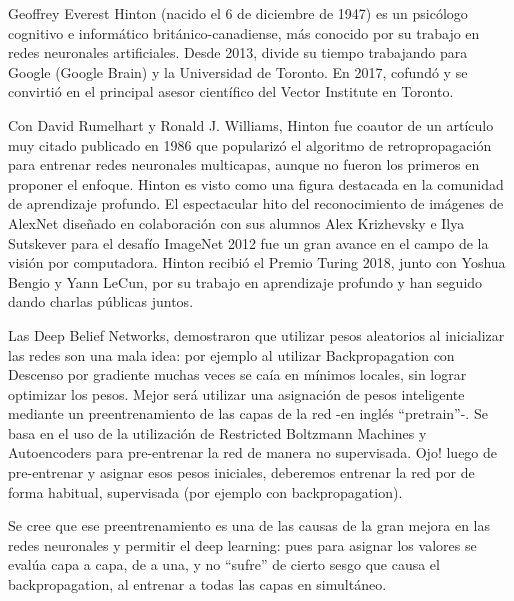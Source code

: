 \documentclass[a4paper]{article}
\begin{document}
Geoffrey Everest Hinton (nacido el 6 de diciembre de 1947) es un 
psicólogo cognitivo e informático británico-canadiense, más 
conocido por su trabajo en redes neuronales artificiales. Desde 
2013, divide su tiempo trabajando para Google (Google Brain) y la 
Universidad de Toronto. En 2017, cofundó y se convirtió en el 
principal asesor científico del Vector Institute en Toronto.

Con David Rumelhart y Ronald J. Williams, Hinton fue coautor de un 
artículo muy citado publicado en 1986 que popularizó el algoritmo 
de retropropagación para entrenar redes neuronales multicapas, 
aunque no fueron los primeros en proponer el enfoque. Hinton es 
visto como una figura destacada en la comunidad de aprendizaje 
profundo. El espectacular hito del reconocimiento de imágenes de 
AlexNet diseñado en colaboración con sus alumnos Alex Krizhevsky e 
Ilya Sutskever para el desafío ImageNet 2012 fue un gran avance en 
el campo de la visión por computadora.
Hinton recibió el Premio Turing 2018, junto con Yoshua Bengio y 
Yann LeCun, por su trabajo en aprendizaje profundo y han seguido 
dando charlas públicas juntos.

Las Deep Belief Networks, demostraron que utilizar pesos 
aleatorios al inicializar las redes son una mala idea: por ejemplo 
al utilizar Backpropagation con Descenso por gradiente muchas 
veces se caía en mínimos locales, sin lograr optimizar los pesos. 
Mejor será utilizar una asignación de pesos inteligente mediante 
un preentrenamiento de las capas de la red -en inglés “pretrain”-. 
Se basa en el uso de la utilización de Restricted Boltzmann 
Machines y Autoencoders para pre-entrenar la red de manera no 
supervisada. Ojo! luego de pre-entrenar y asignar esos pesos 
iniciales, deberemos entrenar la red por de forma habitual, 
supervisada (por ejemplo con backpropagation).

Se cree que ese preentrenamiento es una de las causas de la gran 
mejora en las redes neuronales y permitir el deep learning: pues 
para asignar los valores se evalúa capa a capa, de a una, y no 
“sufre” de cierto sesgo que causa el backpropagation, al entrenar 
a todas las capas en simultáneo.
\end{document}
